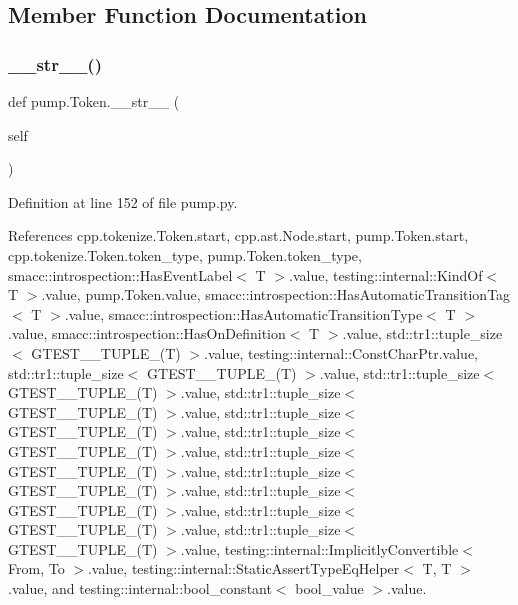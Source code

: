 \subsection{Member Function Documentation}
\mbox{\label{classpump_1_1Token_ad0079ae4449d89bc2d5756488099cb33}} 
\subsubsection{\texorpdfstring{\+\_\+\+\_\+str\+\_\+\+\_\+()}{\_\_str\_\_()}}
{\footnotesize\ttfamily def pump.\+Token.\+\_\+\+\_\+str\+\_\+\+\_\+ (\begin{DoxyParamCaption}\item[{}]{self }\end{DoxyParamCaption})}



Definition at line 152 of file pump.\+py.



References cpp.\+tokenize.\+Token.\+start, cpp.\+ast.\+Node.\+start, pump.\+Token.\+start, cpp.\+tokenize.\+Token.\+token\+\_\+type, pump.\+Token.\+token\+\_\+type, smacc\+::introspection\+::\+Has\+Event\+Label$<$ T $>$.\+value, testing\+::internal\+::\+Kind\+Of$<$ T $>$.\+value, pump.\+Token.\+value, smacc\+::introspection\+::\+Has\+Automatic\+Transition\+Tag$<$ T $>$.\+value, smacc\+::introspection\+::\+Has\+Automatic\+Transition\+Type$<$ T $>$.\+value, smacc\+::introspection\+::\+Has\+On\+Definition$<$ T $>$.\+value, std\+::tr1\+::tuple\+\_\+size$<$ G\+T\+E\+S\+T\+\_\+\_\+\+T\+U\+P\+L\+E\+\_\+(\+T) $>$.\+value, testing\+::internal\+::\+Const\+Char\+Ptr.\+value, std\+::tr1\+::tuple\+\_\+size$<$ G\+T\+E\+S\+T\+\_\+\_\+\+T\+U\+P\+L\+E\+\_\+(\+T) $>$.\+value, std\+::tr1\+::tuple\+\_\+size$<$ G\+T\+E\+S\+T\+\_\+\_\+\+T\+U\+P\+L\+E\+\_\+(\+T) $>$.\+value, std\+::tr1\+::tuple\+\_\+size$<$ G\+T\+E\+S\+T\+\_\+\_\+\+T\+U\+P\+L\+E\+\_\+(\+T) $>$.\+value, std\+::tr1\+::tuple\+\_\+size$<$ G\+T\+E\+S\+T\+\_\+\_\+\+T\+U\+P\+L\+E\+\_\+(\+T) $>$.\+value, std\+::tr1\+::tuple\+\_\+size$<$ G\+T\+E\+S\+T\+\_\+\_\+\+T\+U\+P\+L\+E\+\_\+(\+T) $>$.\+value, std\+::tr1\+::tuple\+\_\+size$<$ G\+T\+E\+S\+T\+\_\+\_\+\+T\+U\+P\+L\+E\+\_\+(\+T) $>$.\+value, std\+::tr1\+::tuple\+\_\+size$<$ G\+T\+E\+S\+T\+\_\+\_\+\+T\+U\+P\+L\+E\+\_\+(\+T) $>$.\+value, std\+::tr1\+::tuple\+\_\+size$<$ G\+T\+E\+S\+T\+\_\+\_\+\+T\+U\+P\+L\+E\+\_\+(\+T) $>$.\+value, std\+::tr1\+::tuple\+\_\+size$<$ G\+T\+E\+S\+T\+\_\+\_\+\+T\+U\+P\+L\+E\+\_\+(\+T) $>$.\+value, std\+::tr1\+::tuple\+\_\+size$<$ G\+T\+E\+S\+T\+\_\+\_\+\+T\+U\+P\+L\+E\+\_\+(\+T) $>$.\+value, testing\+::internal\+::\+Implicitly\+Convertible$<$ From, To $>$.\+value, testing\+::internal\+::\+Static\+Assert\+Type\+Eq\+Helper$<$ T, T $>$.\+value, and testing\+::internal\+::bool\+\_\+constant$<$ bool\+\_\+value $>$.\+value.


